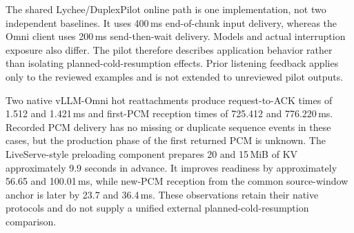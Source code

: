 The shared Lychee/DuplexPilot online path is one implementation,
not two independent baselines.
It uses 400\,ms end-of-chunk input delivery, whereas the Omni client
uses 200\,ms send-then-wait delivery.
Models and actual interruption exposure also differ.
The pilot therefore describes application behavior rather than
isolating planned-cold-resumption effects.
Prior listening feedback applies only to the reviewed examples and
is not extended to unreviewed pilot outputs.

Two native vLLM-Omni hot reattachments \citep{omnidoc} produce
request-to-ACK times of 1.512 and 1.421\,ms and first-PCM reception
times of 725.412 and 776.220\,ms.
Recorded PCM delivery has no missing or duplicate sequence events
in these cases, but the production phase of the first returned PCM
is unknown.
The LiveServe-style preloading component \citep{liveserve2026}
prepares 20 and 15\,MiB of KV approximately 9.9 seconds in advance.
It improves readiness by approximately 56.65 and 100.01\,ms,
while new-PCM reception from the common source-window anchor is
later by 23.7 and 36.4\,ms.
These observations retain their native protocols and do not supply
a unified external planned-cold-resumption comparison.


